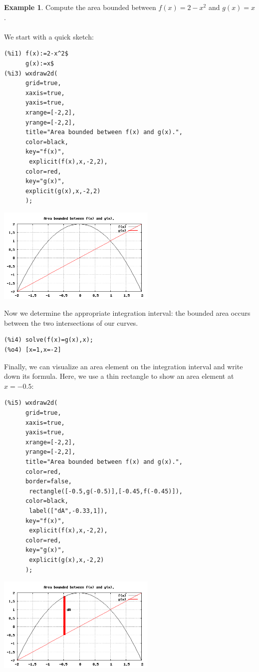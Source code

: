 \documentclass[10.5pt,twoside]{report}
\theoremstyle{definition}
\newtheorem{exmp}{Example}[section]
\begin{document}
\begin{exmp}  Compute the area bounded between $f(x)=2-x^2$ and $g(x)=x$.\\
${}$\\

We start with a quick sketch:

\begin{verbatim}
(%i1) f(x):=2-x^2$
      g(x):=x$
(%i3) wxdraw2d(
      grid=true,
      xaxis=true,
      yaxis=true,
      xrange=[-2,2],
      yrange=[-2,2],
      title="Area bounded between f(x) and g(x).",
      color=black,
      key="f(x)",
       explicit(f(x),x,-2,2),
      color=red,
      key="g(x)",
      explicit(g(x),x,-2,2)
      );
\end{verbatim}

\includegraphics[width=3in]{example_3_1_2_1}

Now we determine the appropriate integration interval:  the bounded area occurs between the two intersections of our curves.

\begin{verbatim}
(%i4) solve(f(x)=g(x),x);
(%o4) [x=1,x=-2]
\end{verbatim}


Finally, we can visualize an area element on the integration interval and write down its formula.  Here, we use a thin rectangle to show an area element at $x=-0.5$:

\begin{verbatim}
(%i5) wxdraw2d(
      grid=true,
      xaxis=true,
      yaxis=true,
      xrange=[-2,2],
      yrange=[-2,2],
      title="Area bounded between f(x) and g(x).",
      color=red,
      border=false,
       rectangle([-0.5,g(-0.5)],[-0.45,f(-0.45)]),
      color=black,
       label(["dA",-0.33,1]),
      key="f(x)",
       explicit(f(x),x,-2,2),
      color=red,
      key="g(x)",
       explicit(g(x),x,-2,2)
      );
\end{verbatim}


\includegraphics[width=3in]{example_3_1_2_2}



\end{exmp}
\end{document}
